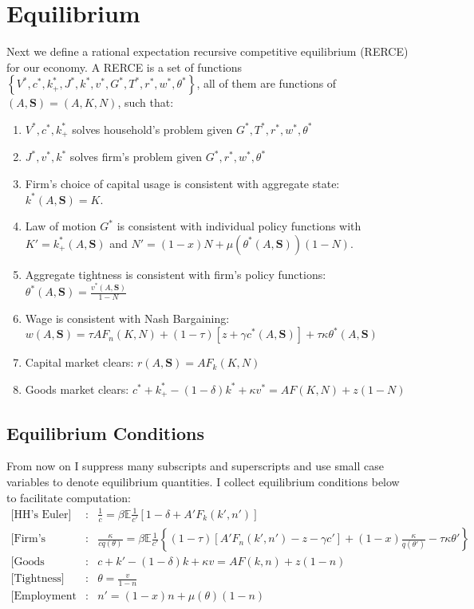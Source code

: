 \documentclass[12pt]{article}
\begin{document}
\section{Equilibrium}
Next we define a rational expectation recursive competitive equilibrium (RERCE) for our economy. A RERCE is a set of functions $\left\{ V^{*}, c^{*}, k_{+}^{*}, J^{*}, k^{*}, v^{*}, G^{*},T^{*},r^{*},w^{*},\theta^{*} \right\} $, all of them are functions of $(A,\mathbf{S})=(A,K,N)$, such that:
\begin{enumerate}
	\item $V^{*},c^{*},k_{+}^{*}$ solves household's problem given $G^{*},T^{*},r^{*},w^{*},\theta^{*}$
	\item $J^{*},v^{*},k^{*}$ solves firm's problem given $G^{*},r^{*},w^{*},\theta^{*}$
	\item Firm's choice of capital usage is consistent with aggregate state: $k^{*}(A,\mathbf{S})=K$.
	\item Law of motion $G^{*}$ is consistent with individual policy functions with $K'=k_{+}^{*}(A,\mathbf{S})$ and $N'=(1-x)N+\mu(\theta^{*}(A,\mathbf{S}))(1-N)$.
	\item Aggregate tightness is consistent with firm's policy functions: $\theta^{*}(A,\mathbf{S})=\frac{v^{*}(A,\mathbf{S})}{1-N}$
	\item Wage is consistent with Nash Bargaining: $w(A,\mathbf{S}) = \tau A F_{n}(K,N) + (1-\tau)\left[ z+\gamma c^{*}(A,\mathbf{S}) \right] + \tau \kappa \theta^{*}(A,\mathbf{S})$
	\item Capital market clears: $r(A,\mathbf{S})=AF_{k}(K,N)$
	\item Goods market clears: $c^{*}+k_{+}^{*}-(1-\delta)k^{*}+\kappa v^{*} = A F(K,N) + z(1-N)$
\end{enumerate}

\subsection{Equilibrium Conditions}
From now on I suppress many subscripts and superscripts and use small case variables to denote equilibrium quantities. I collect equilibrium conditions below to facilitate computation:
\begin{eqnarray}
	\text{[HH's Euler]} & :& \frac{1}{c} =\beta \mathbb{E} \frac{1}{c'} \left[  1-\delta + A'F_{k}(k',n') \right] \label{eqn:HHEuler} \\
	\text{[Firm's Euler]} & :& \frac{\kappa}{c q(\theta)} = \beta \mathbb{E} \frac{1}{c'} \left\{  (1-\tau) \left[ A'F_{n}(k',n')-z-\gamma c' \right]+(1-x)\frac{\kappa}{q(\theta')} -\tau \kappa \theta' \right\} \label{eqn:firmEuler} \\
	\text{[Goods Market]} & :& c+k'-(1-\delta)k + \kappa v = AF(k,n) + z(1-n)\label{eqn:resource} \\
	\text{[Tightness]} & :& \theta = \frac{v}{1-n} \label{eqn:tightness}\\
	\text{[Employment LOM]} & :& n' = (1-x)n+\mu(\theta)(1-n)
\end{eqnarray}
\end{document}
